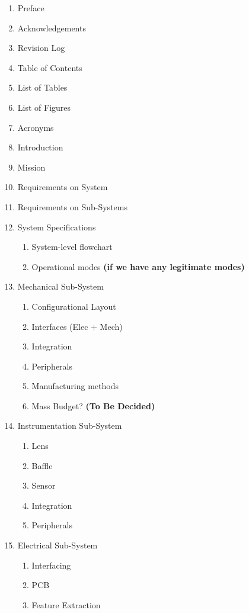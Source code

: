 \begin{enumerate}
    \item Preface
    \item Acknowledgements
    \item Revision Log
    \item Table of Contents
    \item List of Tables
    \item List of Figures
    \item Acronyms
    \item Introduction
    \item Mission
    \item Requirements on System
    \item Requirements on Sub-Systems
    \item System Specifications
    \begin{enumerate}
        \item System-level flowchart
        \item Operational modes \textbf{(if we have any legitimate modes)}
    \end{enumerate}
    \item Mechanical Sub-System
    \begin{enumerate}
        \item Configurational Layout
        \item Interfaces (Elec + Mech)
        \item Integration
        \item Peripherals
        \item Manufacturing methods
        \item Mass Budget? \textbf{(To Be Decided)}
    \end{enumerate}
    \item Instrumentation Sub-System
    \begin{enumerate}
        \item Lens
        \item Baffle
        \item Sensor
        \item Integration
        \item Peripherals
    \end{enumerate}
    \item Electrical Sub-System
    \begin{enumerate}
        \item Interfacing
        \item PCB
        \item Feature Extraction

\end{enumerate}
\end{enumerate}
